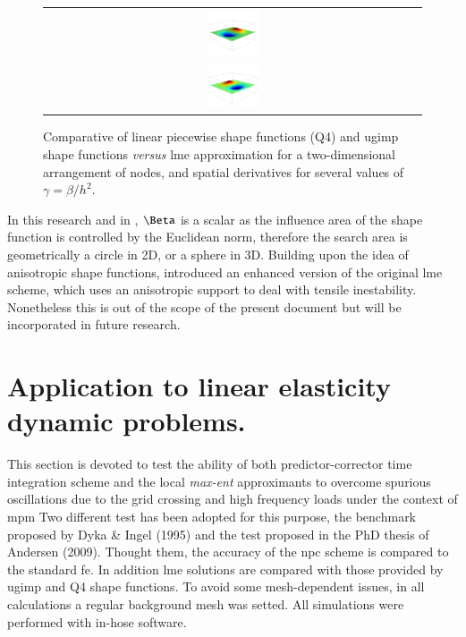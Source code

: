 \documentclass[preprint,12pt,a4paper]{elsarticle}
\begin{document}
\begin{figure}
{\begin{tabular}{c}
      \includegraphics[width=0.14\textwidth]{Figures/LME_5_0_Shape_Fun_dx}\\
      \includegraphics[width=0.14\textwidth]{Figures/LME_5_0_Shape_Fun_dy}
    \end{tabular}
  }
  \caption{Comparative of linear piecewise shape functions (Q4) and
    \acrshort{ugimp} shape functions \textit{versus}  \acrshort{lme}
    approximation for a two-dimensional arrangement of nodes, and
    spatial derivatives for several values of $\gamma = \beta/h^2$.}
  \label{fig:LME_MPM}
\end{figure}
In this research and in \cite{Arroyo2006}, $\Beta$ is a scalar as the
influence area of the shape function is controlled by the Euclidean
norm, therefore the search area is geometrically a circle in 2D, or a
sphere in 3D. Building upon the idea of anisotropic shape functions,
\cite{Kochmann2019} introduced an enhanced version of the original
\acrshort{lme} scheme, which uses an anisotropic support to deal with 
tensile inestability. Nonetheless this is out of the scope of the
present document but will be incorporated in future research.

\section{Application to linear elasticity dynamic problems.}
\label{sec:Application-linear-elasticity-dynamic-problems}

This section is devoted to test the ability of both predictor-corrector
time integration scheme and the local \textit{max-ent} approximants to
overcome spurious oscillations due to the grid crossing and high
frequency loads under the context of \acrshort{mpm} Two different test has
been adopted for this purpose, the benchmark proposed by Dyka \& Ingel
(1995)\cite{Dyka1995} and the test proposed in the PhD thesis of
Andersen (2009)\cite{thesis_Andersen_2009}. Thought them, the accuracy of the \acrshort{npc}
scheme is compared to the standard \acrshort{fe}. In addition \acrshort{lme} solutions
are compared with those provided by \acrfull{ugimp} and Q4 shape
functions. To avoid some mesh-dependent issues, in all
calculations a regular background mesh was setted. All simulations were performed with in-hose software.
\end{document}
